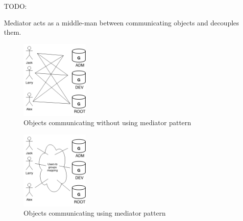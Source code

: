 \begin{multicols}{2}
TODO:

Mediator acts as a middle-man between communicating objects and decouples them\cite{sm-mediator}.

\begin{figure}[H]
	\centering
	\includegraphics[width=0.3\textwidth]{assets/mediator_before}
	\caption{Objects communicating without using mediator pattern}
	\label{fig:mediator-before}
\end{figure}

\begin{figure}[H]
	\centering
	\includegraphics[width=0.3\textwidth]{assets/mediator_after}
	\caption{Objects communicating using mediator pattern}
	\label{fig:mediator-after}
\end{figure}


\end{multicols}
